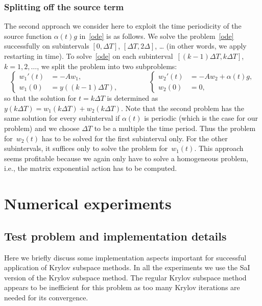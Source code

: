 \documentclass[11pt]{elsarticle}
\begin{document}
\subsubsection{Splitting off the source term}
The second approach we consider here to exploit the time periodicity 
of the source function $\alpha(t)g$ in~\eqref{ode} is as follows.
We solve the problem~\eqref{ode} successfully on subintervals
$[0,\Delta T]$, $[\Delta T, 2\Delta]$, \dots{} (in other words,
we apply restarting in time).  To solve~\eqref{ode} on each
subinterval~$[(k-1)\Delta T,k\Delta T]$, $k=1,2,\dots$, 
we split the problem into two subproblems:
\begin{equation}
\label{split2}
\left\{
\begin{aligned}
w_1'(t) &= -Aw_1, %
\\
w_1(0)  &= y((k-1)\Delta T),
\end{aligned}
\right.  
\qquad\qquad
\left\{
\begin{aligned}
w_2'(t) &= -Aw_2 +\alpha(t)g, %
\\
w_2(0)  &= 0,
\end{aligned}
\right.  
\end{equation}
so that the solution for $t=k\Delta T$ is determined as 
$y(k\Delta T) = w_1(k\Delta T) + w_2(k\Delta T)$.
Note that the second problem has
the same solution for every subinterval
if $\alpha(t)$ is periodic (which is the case for our
problem) and we choose $\Delta T$ to be a multiple the time
period.  Thus the problem for~$w_2(t)$ has to be solved
for the first subinterval only. For the other subintervals,
it suffices only to solve the problem for~$w_1(t)$.  
This approach seems profitable because we again 
only have to solve a homogeneous problem, i.e., the matrix
exponential action has to be computed. 

\section{Numerical experiments}
\label{sect:experim}
\subsection{Test problem and implementation details}
Here we briefly discuss some implementation aspects important for 
successful application of Krylov subspace methods.
In all the experiments we use the SaI version of the Krylov
subspace method.  The regular Krylov subspace method appears to
be inefficient for this problem as too many Krylov iterations
are needed for its convergence.
\end{document}

